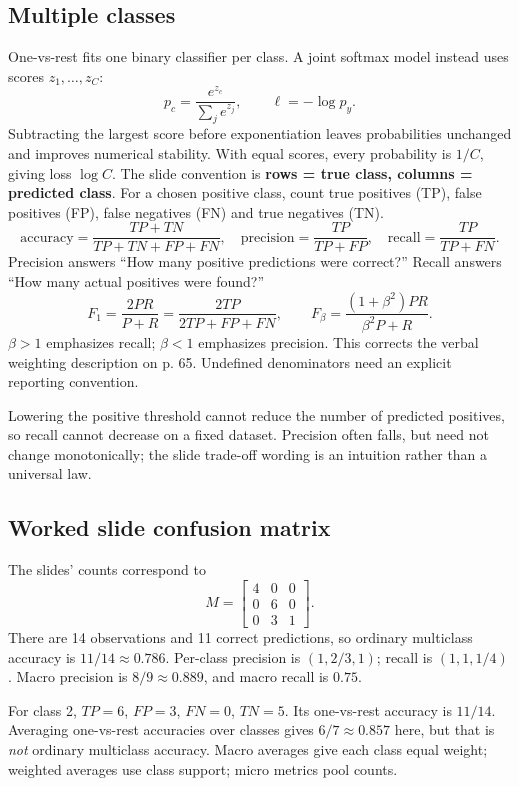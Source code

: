 \documentclass[11pt]{article}
\begin{document}
\subsection{Multiple classes}
One-vs-rest fits one binary classifier per class. A joint softmax model instead uses scores $z_1,\ldots,z_C$:
\[
p_c=\frac{e^{z_c}}{\sum_je^{z_j}},\qquad \ell=-\log p_y.
\]
Subtracting the largest score before exponentiation leaves probabilities unchanged and improves numerical stability. With equal scores, every probability is $1/C$, giving loss $\log C$.
The slide convention is \textbf{rows = true class, columns = predicted class}. For a chosen positive class, count true positives (TP), false positives (FP), false negatives (FN) and true negatives (TN).
\[
\mathrm{accuracy}=\frac{TP+TN}{TP+TN+FP+FN},\quad
\mathrm{precision}=\frac{TP}{TP+FP},\quad
\mathrm{recall}=\frac{TP}{TP+FN}.
\]
Precision answers ``How many positive predictions were correct?'' Recall answers ``How many actual positives were found?''
\[
F_1=\frac{2PR}{P+R}=\frac{2TP}{2TP+FP+FN},\qquad
F_\beta=\frac{(1+\beta^2)PR}{\beta^2P+R}.
\]
$\beta>1$ emphasizes recall; $\beta<1$ emphasizes precision. This corrects the verbal weighting description on p. 65. Undefined denominators need an explicit reporting convention.

Lowering the positive threshold cannot reduce the number of predicted positives, so recall cannot decrease on a fixed dataset. Precision often falls, but need not change monotonically; the slide trade-off wording is an intuition rather than a universal law.
\subsection{Worked slide confusion matrix}
The slides' counts correspond to
\[
M=\begin{bmatrix}4&0&0\\0&6&0\\0&3&1\end{bmatrix}.
\]
There are 14 observations and 11 correct predictions, so ordinary multiclass accuracy is $11/14\approx0.786$. Per-class precision is $(1,2/3,1)$; recall is $(1,1,1/4)$. Macro precision is $8/9\approx0.889$, and macro recall is $0.75$.

For class 2, $TP=6$, $FP=3$, $FN=0$, $TN=5$. Its one-vs-rest accuracy is $11/14$. Averaging one-vs-rest accuracies over classes gives $6/7\approx0.857$ here, but that is \emph{not} ordinary multiclass accuracy. Macro averages give each class equal weight; weighted averages use class support; micro metrics pool counts.
\end{document}
